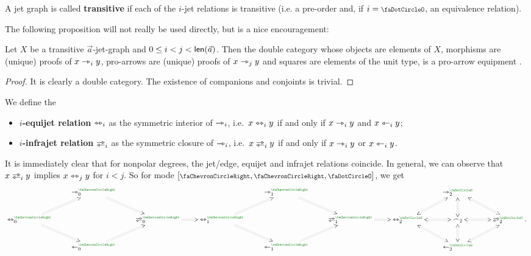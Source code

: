 \documentclass[a4paper]{memoir}
\begin{document}
\begin{definition} \label{def:transitive-jetgph}
	A jet graph is called \textbf{transitive} if each of the $i$-jet relations is transitive (i.e. a pre-order and, if $i = \npolar$, an equivalence relation).
\end{definition}
The following proposition will not really be used directly, but is a nice encouragement:
\begin{proposition} \label{thm:jetgph-equipment}
	Let $X$ be a transitive $\vec a$-jet-graph and $0 \leq i < j < \mathsf{len}(\vec a)$.
	Then the double category whose objects are elements of $X$, morphisms are (unique) proofs of $x \rightarrowtriangle_i y$, pro-arrows are (unique) proofs of $x \rightarrowtriangle_{j} y$ and squares are elements of the unit type, is a pro-arrow equipment \cite{nlab:proarrow,proarrow1,proarrow2}.
\end{proposition}
\begin{proof}
	It is clearly a double category. The existence of companions and conjoints is trivial.
\end{proof}
\begin{definition}
	We define the
	\begin{itemize}
		\item \textbf{$i$-equijet relation} $\leftrightarrowtriangle_i$ as the symmetric interior of $\rightarrowtriangle_i$, i.e.\ $x \leftrightarrowtriangle_i y$ if and only if $x \rightarrowtriangle_i y$ and $x \leftarrowtriangle_i y$;
		\item \textbf{$i$-infrajet relation} $\infrajet_i$ as the symmetric closure of $\rightarrowtriangle_i$, i.e.\ $x \infrajet_i y$ if and only if $x \rightarrowtriangle_i y$ or $x \leftarrowtriangle_i y$.
	\end{itemize}
\end{definition}
It is immediately clear that for nonpolar degrees, the jet/edge, equijet and infrajet relations coincide.
In general, we can observe that $x \infrajet_i y$ implies $x \leftrightarrowtriangle_j y$ for $i < j$.
So for mode $[\ypolar, \ypolar, \npolar]$, we get
\[
\xymatrix{
	& 
	\jet_0\pmr\ypolar
		\ar@{:>}[rd]
	&&& 
	\jet_1\pmr\ypolar
		\ar@{:>}[rd]
	&&& 
	\jet_2\pmr\npolar
		\ar@{<:>}[rd]
	\\
	\equijet_0\pmr\ypolar
		\ar@{:>}[ru]
		\ar@{:>}[rd]
	&&
	\infrajet_0\pmr\ypolar
		\ar@{:>}[r]
	&
	\equijet_1\pmr\ypolar
		\ar@{:>}[ru]
		\ar@{:>}[rd]
	&&
	\infrajet_1\pmr\ypolar
		\ar@{:>}[r]
	&
	\equijet_2\pmr\npolar
		\ar@{<:>}[ru]
		\ar@{<:>}[rd]
	&
	\edge_2
		\ar@{<:>}[l]
		\ar@{<:>}[u]
		\ar@{<:>}[r]
		\ar@{<:>}[d]
	&
	\infrajet_2\pmr\npolar.
	\\
	& 
	\tej_0\pmr\ypolar
		\ar@{:>}[ru]
	&&& 
	\tej_1\pmr\ypolar 
		\ar@{:>}[ru]
	&&& 
	\tej_2\pmr\npolar
		\ar@{<:>}[ru]
}
\]
\end{document}
